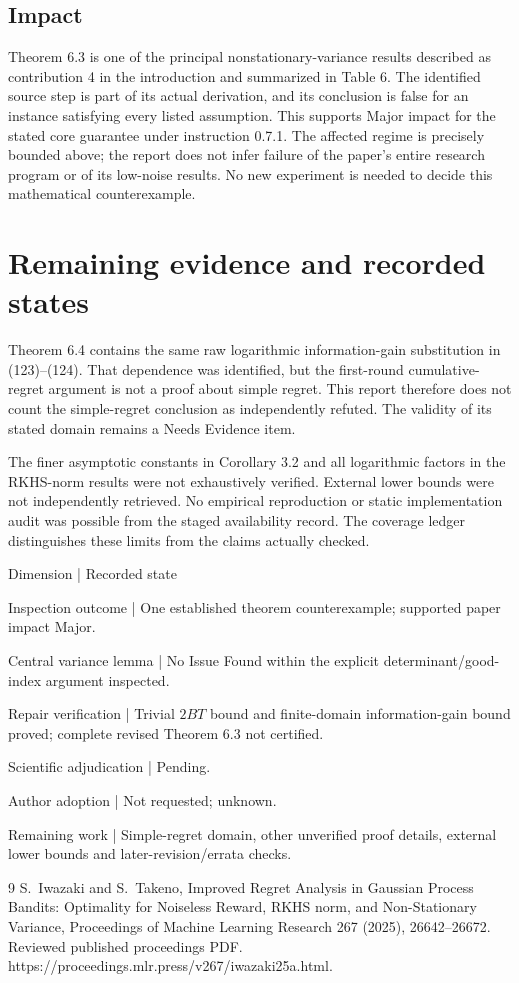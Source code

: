 \documentclass[10pt]{article}
\begin{document}
\subsection*{Impact}
Theorem 6.3 is one of the principal nonstationary-variance results described as contribution 4 in the introduction and summarized in Table 6. The identified source step is part of its actual derivation, and its conclusion is false for an instance satisfying every listed assumption. This supports Major impact for the stated core guarantee under instruction 0.7.1. The affected regime is precisely bounded above; the report does not infer failure of the paper’s entire research program or of its low-noise results. No new experiment is needed to decide this mathematical counterexample.\par
\section*{Remaining evidence and recorded states}
Theorem 6.4 contains the same raw logarithmic information-gain substitution in (123)–(124). That dependence was identified, but the first-round cumulative-regret argument is not a proof about simple regret. This report therefore does not count the simple-regret conclusion as independently refuted. The validity of its stated domain remains a Needs Evidence item.\par
The finer asymptotic constants in Corollary 3.2 and all logarithmic factors in the RKHS-norm results were not exhaustively verified. External lower bounds were not independently retrieved. No empirical reproduction or static implementation audit was possible from the staged availability record. The coverage ledger distinguishes these limits from the claims actually checked.\par
Dimension | Recorded state\par
Inspection outcome | One established theorem counterexample; supported paper impact Major.\par
Central variance lemma | No Issue Found within the explicit determinant/good-index argument inspected.\par
Repair verification | Trivial \(2BT\) bound and finite-domain information-gain bound proved; complete revised Theorem 6.3 not certified.\par
Scientific adjudication | Pending.\par
Author adoption | Not requested; unknown.\par
Remaining work | Simple-regret domain, other unverified proof details, external lower bounds and later-revision/errata checks.\par
9 S. Iwazaki and S. Takeno, Improved Regret Analysis in Gaussian Process Bandits: Optimality for Noiseless Reward, RKHS norm, and Non-Stationary Variance, Proceedings of Machine Learning Research 267 (2025), 26642–26672. Reviewed published proceedings PDF. https://proceedings.mlr.press/v267/iwazaki25a.html.\par
\end{document}
